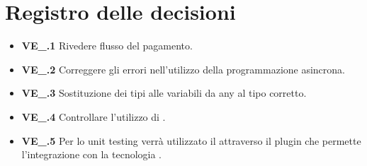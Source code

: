 \section{Registro delle decisioni}
\begin{itemize}
	\item \textbf{VE\_\Data.1} Rivedere flusso del pagamento.
	\item \textbf{VE\_\Data.2} Correggere gli errori nell'utilizzo della programmazione asincrona.
	\item \textbf{VE\_\Data.3} Sostituzione dei tipi alle variabili da any al tipo corretto.
	\item \textbf{VE\_\Data.4} Controllare l'utilizzo di .
	\item \textbf{VE\_\Data.5} Per lo unit testing verrà utilizzato il   attraverso il plugin che permette l'integrazione con la tecnologia .
\end{itemize}

